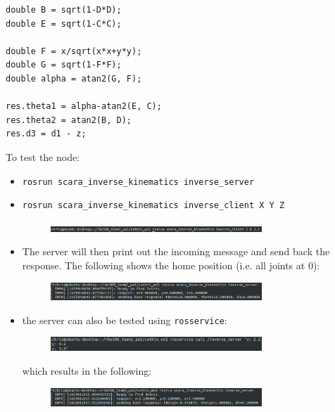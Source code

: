 \documentclass[10pt]{article}
\begin{document}
\begin{enumerate}
\begin{lstlisting}[style=Matlab-editor,basicstyle=\mlttfamily,escapechar=`]
double B = sqrt(1-D*D);
double E = sqrt(1-C*C);

double F = x/sqrt(x*x+y*y);
double G = sqrt(1-F*F);	
double alpha = atan2(G, F);

res.theta1 = alpha-atan2(E, C);
res.theta2 = atan2(B, D);
res.d3 = d1 - z;
\end{lstlisting}

To test the node:
\begin{itemize}
	\item \texttt{rosrun scara\_inverse\_kinematics inverse\_server}
	\item \texttt{rosrun scara\_inverse\_kinematics inverse\_client X Y Z}
	
	\begin{figure}[H]
		\centering
		\includegraphics[width=0.75\textwidth]{figures/client_print.png}
	\end{figure}

	\item The server will then print out the incoming message and send back the response. The following shows the home position (i.e. all joints at 0):
	
	\begin{figure}[H]
		\centering
		\includegraphics[width=0.75\textwidth]{figures/server_print.png}
	\end{figure}
	
	\item the server can also be tested using \texttt{rosservice}:
	
	\begin{figure}[H]
		\centering
		\includegraphics[width=0.75\textwidth]{figures/rosservice_call.png}
	\end{figure}
	
	which results in the following:
	
	\begin{figure}[H]
		\centering
		\includegraphics[width=0.75\textwidth]{figures/server_rosservice.png}
	\end{figure}
\end{itemize}

\end{enumerate}
\end{document}
